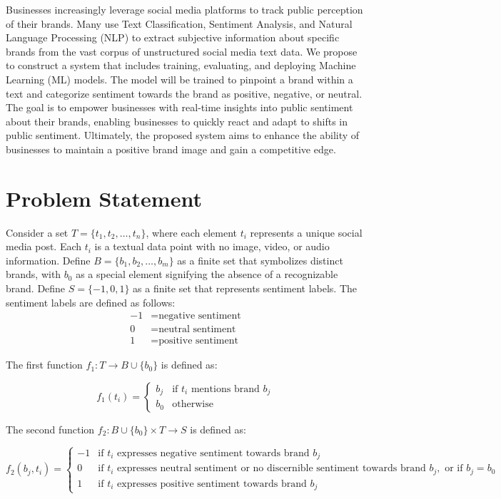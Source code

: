\documentclass{article}
\begin{document}
Businesses increasingly leverage social media platforms to track public
perception of their brands. Many use Text Classification, Sentiment Analysis,
and Natural Language Processing (NLP) to extract subjective information about
specific brands from the vast corpus of unstructured social media text data. We
propose to construct a system that includes training, evaluating, and deploying
Machine Learning (ML) models. The model will be trained to pinpoint a brand
within a text and categorize sentiment towards the brand as positive, negative,
or neutral. The goal is to empower businesses with real-time insights into
public sentiment about their brands, enabling businesses to quickly react and
adapt to shifts in public sentiment. Ultimately, the proposed system aims to
enhance the ability of businesses to maintain a positive brand image and gain a
competitive edge.

\section{Problem Statement}

Consider a set $T = \{t_1, t_2, \ldots, t_n\}$, where each element $t_i$
represents a unique social media post. Each $t_i$ is a textual data point with
no image, video, or audio information. Define $B = \{b_1, b_2, \ldots, b_m\}$
as a finite set that symbolizes distinct brands, with $b_0$ as a special
element signifying the absence of a recognizable brand. Define $S = \{-1, 0,
    1\}$ as a finite set that represents sentiment labels. The sentiment labels
are
defined as follows:
\begin{align*}
    -1 & = \text{negative sentiment} \\
    0  & = \text{neutral sentiment}  \\
    1  & = \text{positive sentiment}
\end{align*}

The first function $f_1: T \rightarrow B \cup \{b_0\}$ is defined as:

\[
    f_1(t_i) =
    \begin{cases}
        b_j & \text{if } t_i \text{ mentions brand } b_j \\
        b_0 & \text{otherwise}
    \end{cases}
\]

The second function $f_2: B \cup \{b_0\} \times T \rightarrow S$
is defined as:

\[
    f_2(b_j, t_i) =
    \begin{cases}
        -1 & \text{if } t_i \text{ expresses negative sentiment towards
            brand } b_j
        \\
        0  & \text{if } t_i \text{ expresses neutral sentiment or no
            discernible
            sentiment towards
            brand } b_j, \text{ or if } b_j = b_0
        \\
        1  & \text{if } t_i \text{ expresses positive sentiment towards
            brand } b_j
    \end{cases}
\]
\end{document}
